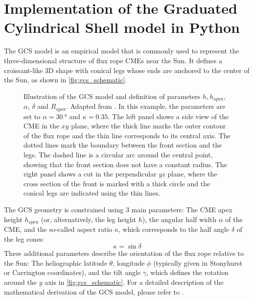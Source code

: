 \chapter{Implementation of the Graduated Cylindrical Shell model in Python}
\label{chp:GCS_Python}

The \acl{GCS} model \citep[\acs{GCS},][]{Thernisien-2006-GCS,Thernisien-2011-GCS} is an empirical model that is commonly used to represent the three-dimensional structure of flux rope \acp{CME}  near the Sun. It defines a croissant-like 3D shape with conical legs whose ends are anchored to the center of the Sun, as shown in \autoref{fig:gcs_schematic}.

\begin{figure}
    
    \caption[Illustration of the \ac{GCS} model]{Illustration of the \ac{GCS} model and definition of parameters $h, h_\text{apex}$, $\alpha$, $\delta$ and $R_\text{apex}$. Adapted from \citet{Thernisien-2011-GCS}. In this example, the parameters are set to $\alpha = \SI{30}{\degree}$ and $\kappa = 0.35$. The left panel shows a side view of the \ac{CME} in the $xy$ plane, where the thick line marks the outer contour of the flux rope and the thin line corresponds to its central axis. The dotted lines mark the boundary between the front section and the legs. The dashed line is a circular arc around the central point, showing that the front section does not have a constant radius. The right panel shows a cut in the perpendicular $yz$ plane, where the cross section of the front is marked with a thick circle and the conical legs are indicated using the thin lines.}
    \label{fig:gcs_schematic}
\end{figure}

The \ac{GCS} geometry is constrained using 3 main parameters: The \ac{CME} apex height $h_\text{apex}$ (or, alternatively, the leg height $h$), the angular half width $\alpha$ of the \ac{CME}, and the so-called aspect ratio $\kappa$, which corresponds to the half angle $\delta$ of the leg cones:
\begin{equation}
    \kappa = \sin \delta
\end{equation}
Three additional parameters describe the orientation of the flux rope relative to the Sun: The heliographic latitude $\theta$, longitude $\phi$ (typically given in Stonyhurst or Carrington coordinates), and the tilt angle $\gamma$, which defines the rotation around the $y$ axis in \autoref{fig:gcs_schematic}. For a detailed description of the mathematical derivation of the \ac{GCS} model, please refer to \citet{Thernisien-2011-GCS}.

